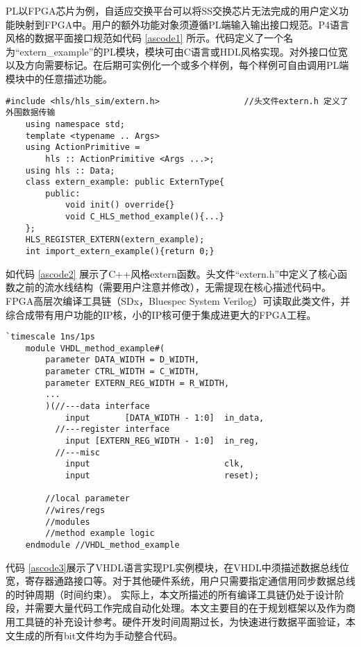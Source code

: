PL以FPGA芯片为例，自适应交换平台可以将SS交换芯片无法完成的用户定义功能映射到FPGA中。用户的额外功能对象须遵循PL端输入输出接口规范。P4语言风格的数据平面接口规范如代码 \ref{ascode1} 所示。代码定义了一个名为“extern\_example”的PL模块，模块可由C语言或HDL风格实现。对外接口位宽以及方向需要标记。在后期可实例化一个或多个样例，每个样例可自由调用PL端模块中的任意描述功能。

{\fontsize{10pt}{0.5\baselineskip}\selectfont
	\begin{lstlisting}[caption={extern实例的C++类声明},label={ascode2}]
	#include <hls/hls_sim/extern.h>					//头文件extern.h 定义了外围数据传输
	using namespace std;
	template <typename .. Args>
	using ActionPrimitive =
		hls :: ActionPrimitive <Args ...>;
	using hls :: Data;
	class extern_example: public ExternType{
		public:
			void init() override{}
			void C_HLS_method_example(){...}
	};
	HLS_REGISTER_EXTERN(extern_example);
	int import_extern_example(){return 0;}
	\end{lstlisting}
}

如代码 \ref{ascode2} 展示了C++风格extern函数。头文件“extern.h”中定义了核心函数之前的流水线结构（需要用户注意并修改），无需提现在核心描述代码中。FPGA高层次编译工具链（SDx，Bluespec System Verilog）可读取此类文件，并综合成带有用户功能的IP核，小的IP核可便于集成进更大的FPGA工程。

{\fontsize{10pt}{0.5\baselineskip}\selectfont
	\begin{lstlisting}[caption={extern实例的VHDL模块声明},label={ascode3}]
	`timescale 1ns/1ps
	module VHDL_method_example#(
		parameter DATA_WIDTH = D_WIDTH,
		parameter CTRL_WIDTH = C_WIDTH,
		parameter EXTERN_REG_WIDTH = R_WIDTH,
		...
		)(//---data interface
			input		[DATA_WIDTH - 1:0]	in_data,
		  //---register interface
		  	input [EXTERN_REG_WIDTH - 1:0]  in_reg,
		  //---misc
		  	input							clk,
		  	input							reset);
		  	
		//local parameter
		//wires/regs
		//modules
		//method example logic
	endmodule //VHDL_method_example
	\end{lstlisting}
}

代码 \ref{ascode3}展示了VHDL语言实现PL实例模块，在VHDL中须描述数据总线位宽，寄存器通路接口等。对于其他硬件系统，用户只需要指定通信用同步数据总线的时钟周期（时间约束）。
实际上，本文所描述的所有编译工具链仍处于设计阶段，并需要大量代码工作完成自动化处理。本文主要目的在于规划框架以及作为商用工具链的补充设计参考。硬件开发时间周期过长，为快速进行数据平面验证，本文生成的所有bit文件均为手动整合代码。

\label{chap44}

